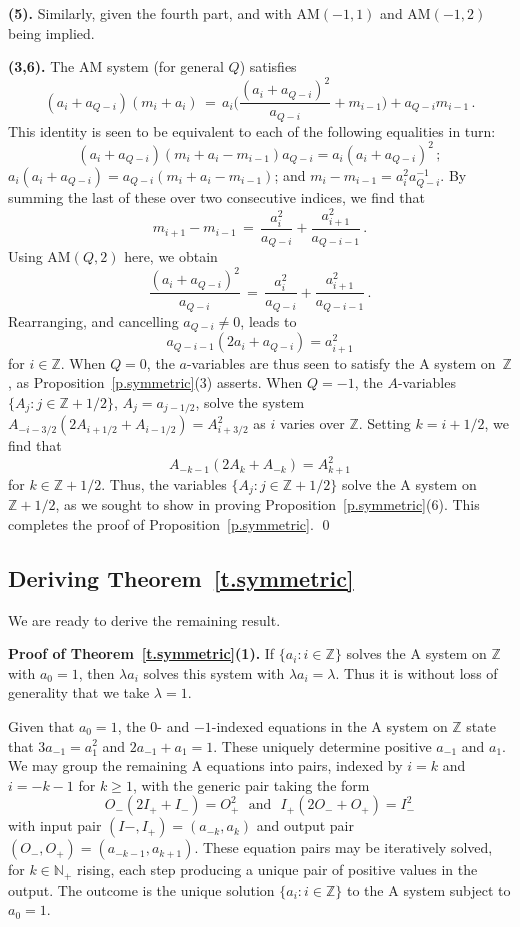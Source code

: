 \documentclass[letterpaper,11pt,oneside,reqno]{amsbook}
\newcommand{\N}{\ensuremath{\mathbb{N}}}
\newcommand{\Z}{\ensuremath{\mathbb{Z}}}
\numberwithin{figure}{chapter}
\theoremstyle{definition}
\theoremstyle{definition}
\theoremstyle{definition}
\theoremstyle{definition}
\theoremstyle{definition}
\newcommand{\nwithoutzero}{\N_+}
\newcommand{\ammac}{\textrm{AM}}
\newcommand{\ammacspace}{\textrm{AM} }
\newcommand{\amacspace}{\textrm{A} }
\begin{document}
  {\bf (5).} Similarly, given the fourth part, and with   \ammac$(-1,1)$ and \ammac$(-1,2)$ being implied.


  {\bf (3,6).}  The \ammacspace system (for general $Q$) satisfies
$$
  (a_i + a_{Q-i})(m_i+a_i)  \, = \, a_i \bigg( \frac{(a_i + a_{Q-i})^2}{a_{Q-i}} + m_{i-1} \bigg) + a_{Q-i} m_{i-1}  \, .
$$
This identity is seen to be equivalent to each of the following equalities in turn:
$$
(a_i + a_{Q-i})(m_i+a_i - m_{i-1}) a_{Q-i} = a_i(a_i + a_{Q-i})^2 \, ;
$$
 $a_i(a_i + a_{Q-i}) = a_{Q-i} (m_i + a_i - m_{i-1})$; and
 $m_i - m_{i-1} = a_i^2 a^{-1}_{Q-i}$. By summing the last of these over two consecutive indices, we find that
$$
 m_{i+1} - m_{i-1} \, = \, \frac{a_i^2}{a_{Q-i}} + \frac{a_{i+1}^2}{a_{Q-i-1}} \, .
$$
Using \ammac$(Q,2)$ here, we obtain    
$$
\frac{(a_i + a_{Q-i})^2}{a_{Q-i}} \, = \, \frac{a_i^2}{a_{Q-i}} + \frac{a_{i+1}^2}{a_{Q-i-1}} \, . 
$$ 
Rearranging, and cancelling $a_{Q - i} \not= 0$, leads to
 $$
 a_{Q-i-1}(2a_i + a_{Q-i}) = a_{i+1}^2
 $$
 for $i \in \Z$.
 When $Q=0$, the $a$-variables are thus seen to satisfy the \amacspace system on~$\Z$, as Proposition~\ref{p.symmetric}(3) asserts. 
 When $Q=-1$, the $A$-variables $\big\{ A_j: j \in \Z +1/2 \big\}$, $A_j = a_{j-1/2}$, solve the system $A_{-i -3/2}(2 A_{i+1/2} + A_{i - 1/2}) = A_{i + 3/2}^2$ as $i$ varies over $\Z$. Setting $k = i + 1/2$,
 we find that 
 $$
 A_{-k-1}(2A_k + A_{-k}) = A_{k+1}^2
 $$ 
 for $k \in \Z + 1/2$. Thus, the variables $\big\{ A_j: j \in \Z +1/2 \big\}$
 solve
  the \amacspace system on~$\Z + 1/2$, as we sought to show in proving Proposition~\ref{p.symmetric}(6).
 This completes the proof of Proposition~\ref{p.symmetric}. \qed

\subsection{Deriving Theorem~\ref{t.symmetric}}

We are ready to derive the remaining result.

{\bf Proof of Theorem~\ref{t.symmetric}(1).} If $\big\{ a_i: i \in \Z \big\}$ solves the \amacspace system on $\Z$ with $a_0 = 1$, then $\lambda a_i$ solves this system with $\lambda a_i = \lambda$. Thus it is without loss of generality that we take $\lambda = 1$.

Given that $a_0 = 1$, the $0$- and $-1$-indexed equations in the \amacspace system on $\Z$ state that $3 a_{-1} = a_1^2$ and $2a_{-1} + a_1 = 1$. These uniquely determine positive $a_{-1}$ and $a_1$.
We may group the remaining \amacspace equations into pairs, indexed by $i=k$ and $i = -k-1$ for $k \geq 1$, with the generic pair taking the form
\begin{equation}\label{e.inputoutput}
 O_- (2I_+ + I_-) = O_+^2
 \, \, \, \, \textrm{and} \, \, \, \, I_+ (2O_- + O_+) = I_-^2
\end{equation}
with input pair $(I-,I_+) = (a_{-k},a_k)$ and output pair $(O_-,O_+) = (a_{-k-1},a_{k+1})$. These equation pairs may be iteratively solved, for $k \in \nwithoutzero$ rising, each step producing a unique pair of positive values in the output. The outcome is the unique solution  $\big\{ a_i: i \in \Z \big\}$ to the \amacspace system subject to $a_0 =1$.
\end{document}
